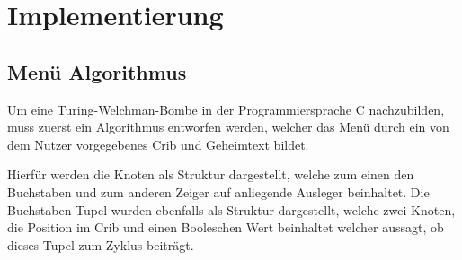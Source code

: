 \chapter{Implementierung}\label{ch:implementation}

%
%

\section{Menü Algorithmus}\label{sec:cycle-finding-algorithm}
Um eine Turing-Welchman-Bombe in der Programmiersprache C nachzubilden, muss zuerst ein Algorithmus entworfen werden, welcher das Menü durch ein von dem Nutzer vorgegebenes Crib und 
Geheimtext bildet.

Hierfür werden die Knoten als Struktur dargestellt, welche zum einen den Buchstaben und zum anderen Zeiger auf anliegende Ausleger beinhaltet. 
Die Buchstaben-Tupel wurden ebenfalls als Struktur dargestellt, welche zwei Knoten, die Position im Crib und einen Booleschen Wert beinhaltet welcher aussagt, ob dieses Tupel zum Zyklus beiträgt.


